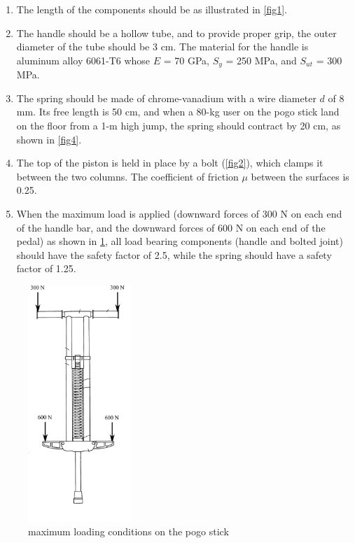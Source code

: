 \documentclass[
10pt,
a4paper,
openany,
svgnames,
]{book}
\begin{document}
\begin{exercises}
  \begin{enumerate}
  \item The length of the components should be as illustrated in \cref{fig1}.
  \item The handle should be a hollow tube, and to provide proper
    grip, the outer diameter of the tube should be 3 cm. The material
    for the handle is aluminum alloy 6061-T6 whose $E$ = 70 GPa, $S_y$ =
    250 MPa, and $S_{ut}$ = 300 MPa.
  \item The spring should be made of chrome-vanadium with a wire
    diameter $d$ of 8 mm. Its free length is 50 cm, and when a 80-kg
    user on the pogo stick land on the floor from a 1-m high jump, the
    spring should contract by 20 cm, as shown in \cref{fig4}.
  \item The top of the piston is held in place by a bolt (\cref{fig2}), which clamps it between the two columns. The coefficient of friction $\mu$ between the surfaces is 0.25. 
  \item When the maximum load is applied (downward forces of 300 N on
    each end of the handle bar, and the downward forces of 600 N on each
    end of the pedal) as shown in \cref{fig3}, all load bearing
    components (handle and bolted joint) should have the safety factor
    of 2.5, while the spring should have a safety factor of 1.25.
    
  \end{enumerate}
  
  \begin{figure}[H]
    \centering
    \includegraphics[width=0.35\textwidth]{pictures/Machine-interaction/pogostick-load}
    \caption{maximum loading conditions on the pogo stick}
    \label{fig3}
  \end{figure}
  

\end{exercises}
\end{document}
